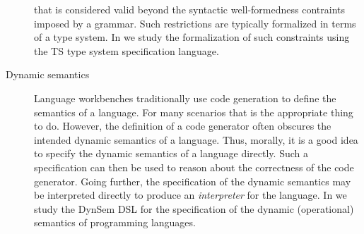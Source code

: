 \begin{description}
that is considered valid beyond the syntactic well-formedness contraints imposed
by a grammar. Such restrictions are typically formalized in terms of a type
system. In  we study the formalization of such constraints using
the TS type system specification language. 
\item[Dynamic semantics] Language workbenches traditionally use code generation
to define the semantics of a language. For many scenarios that is the
appropriate thing to do. However, the definition of a code generator often
obscures the intended dynamic semantics of a language. Thus, morally, it is a
good idea to specify the dynamic semantics of a language directly. Such a
specification can then be used to reason about the correctness of the code
generator. Going further, the specification of the dynamic semantics may be
interpreted directly to produce an \emph{interpreter} for the language. In
 we study the DynSem DSL for the specification of the dynamic
(operational) semantics of programming languages.
\end{description}


